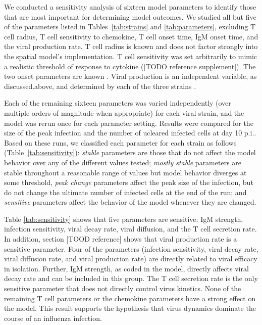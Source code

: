 \documentclass[10pt]{article}
\begin{document}
We conducted a sensitivity analysis of sixteen model parameters to identify those that are most important for determining model outcomes.  We studied all but five of the parameters listed in Tables~\ref{tab:strains} and \ref{tab:parameters}, excluding T cell radius, T cell sensitivity to chemokine, T cell onset time, IgM onset time, and the viral production rate.  T cell radius is known \cite{abbas2011cellular} and does not factor strongly into the spatial model's implementation.  T cell sensitivity was set arbitrarily to mimic a realistic threshold of response to cytokine ([TODO reference supplement]).  The two onset parameters are known \cite{Diamond2003}.  Viral production is an independent variable, as discussed.above, and determined by each of the three strains \cite{Mitchell2011}.


Each of the remaining sixteen parameters was varied independently (over multiple orders of magnitude when appropriate) for each viral strain, and the model was rerun once for each parameter setting.  Results were compared for the size of the peak infection and the number of ucleared infected cells at day 10 p.i.. Based on these runs, we classified each parameter for each strain as follows (Table~\ref{tab:sensitivity}): \textit{stable} parameters are those that do not affect the model behavior over any of the different values tested; \textit{mostly stable} parameters are stable throughout a reasonable range of values but model behavior diverges at some threshold, \textit{peak change} parameters affect the peak size of the infection, but do not change the ultimate number of infected cells at the end of the run; and \textit{sensitive} parameters affect the behavior of the model whenever they are changed.

Table \ref{tab:sensitivity} shows that five parameters are sensitive: IgM strength, infection sensitivity, viral decay rate, viral diffusion, and the T cell secretion rate.  In addition, section [TOOD reference] shows that viral production rate is a sensitive parameter.  Four of the parameters (infection sensitivity, viral decay rate, viral diffusion rate, and viral production rate) are directly related to viral efficacy in isolation.  Further, IgM strength, as coded in the model, directly affects viral decay rate and can be included in this group.  The T cell secretion rate is the only sensitive parameter that does not directly control virus kinetics.  None of the remaining T cell parameters or the chemokine parameters have a strong effect on the model.  This result supports the hypothesis that virus dynamics dominate the course of an influenza infection.  
\end{document}
